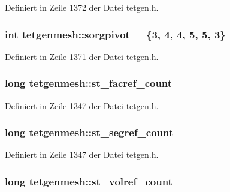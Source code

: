 Definiert in Zeile 1372 der Datei tetgen.\-h.

\hypertarget{classtetgenmesh_a36e2c583a5a4148c7ca53888b7bd928d}{
\subsubsection[{sorgpivot}]{\setlength{\rightskip}{0pt plus 5cm}int tetgenmesh\-::sorgpivot = \{3, 4, 4, 5, 5, 3\}\hspace{0.3cm}{\ttfamily [static]}}}\label{classtetgenmesh_a36e2c583a5a4148c7ca53888b7bd928d}


Definiert in Zeile 1371 der Datei tetgen.\-h.

\hypertarget{classtetgenmesh_aa6a2b877259f953e10e48bfa4788ef83}{
\subsubsection[{st\-\_\-facref\-\_\-count}]{\setlength{\rightskip}{0pt plus 5cm}long tetgenmesh\-::st\-\_\-facref\-\_\-count}}\label{classtetgenmesh_aa6a2b877259f953e10e48bfa4788ef83}


Definiert in Zeile 1347 der Datei tetgen.\-h.

\hypertarget{classtetgenmesh_ac2b943e3323faea3af2521fede229024}{
\subsubsection[{st\-\_\-segref\-\_\-count}]{\setlength{\rightskip}{0pt plus 5cm}long tetgenmesh\-::st\-\_\-segref\-\_\-count}}\label{classtetgenmesh_ac2b943e3323faea3af2521fede229024}


Definiert in Zeile 1347 der Datei tetgen.\-h.

\hypertarget{classtetgenmesh_afa7b63c64990d773c22700fd9022bbdd}{
\subsubsection[{st\-\_\-volref\-\_\-count}]{\setlength{\rightskip}{0pt plus 5cm}long tetgenmesh\-::st\-\_\-volref\-\_\-count}}\label{classtetgenmesh_afa7b63c64990d773c22700fd9022bbdd}


